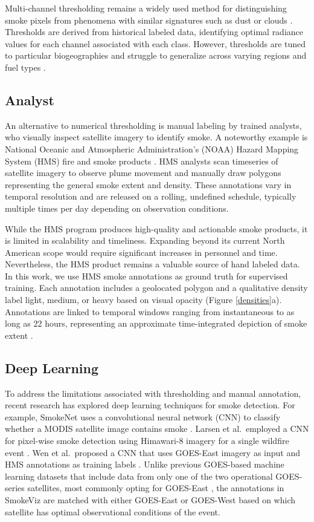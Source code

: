 \documentclass{article}
\begin{document}
Multi-channel thresholding remains a widely used method for distinguishing smoke pixels from phenomena with similar signatures such as dust or clouds \cite{threshold}. Thresholds are derived from historical labeled data, identifying optimal radiance values for each channel associated with each class. 
However, thresholds are tuned to particular biogeographies and struggle to generalize across varying regions and fuel types \cite{thresh_geog}.

\subsection{Analyst} 


An alternative to numerical thresholding is manual labeling by trained analysts, who visually inspect satellite imagery to identify smoke. A noteworthy example is National Oceanic and Atmospheric Administration's (NOAA) Hazard Mapping System (HMS) fire and smoke products \cite{hms, hms_val}. HMS analysts scan timeseries of satellite imagery to observe plume movement and manually draw polygons representing the general smoke extent and density. These annotations vary in temporal resolution and are released on a rolling, undefined schedule, typically multiple times per day depending on observation conditions.

While the HMS program produces high-quality and actionable smoke products, it is limited in scalability and timeliness. Expanding beyond its current North American scope would require significant increases in personnel and time. Nevertheless, the HMS product remains a valuable source of hand labeled data. In this work, we use HMS smoke annotations as ground truth for supervised training. Each annotation includes a geolocated polygon and a qualitative density label light, medium, or heavy based on visual opacity (Figure \ref{densities}a). Annotations are linked to temporal windows ranging from instantaneous to as long as 22 hours, representing an approximate time-integrated depiction of smoke extent \cite{hms_web}.

\subsection{Deep Learning}

To address the limitations associated with thresholding and manual annotation, recent research has explored deep learning techniques for smoke detection. For example, SmokeNet uses a convolutional neural network (CNN) to classify whether a MODIS satellite image contains smoke \cite{smokenet}. Larsen et al.\ employed a CNN for pixel-wise smoke detection using Himawari-8 imagery for a single wildfire event \cite{larsen}. Wen et al.\ proposed a CNN that uses GOES-East imagery as input and HMS annotations as training labels \cite{smoke_goes}. Unlike previous GOES-based machine learning datasets that include data from only one of the two operational GOES-series satellites, most commonly opting for GOES-East \cite{smoke_goes, wildfire_detect, goes_conv, contrail}, the annotations in SmokeViz are matched with either GOES-East or GOES-West based on which satellite has optimal observational conditions of the event. 
\end{document}
